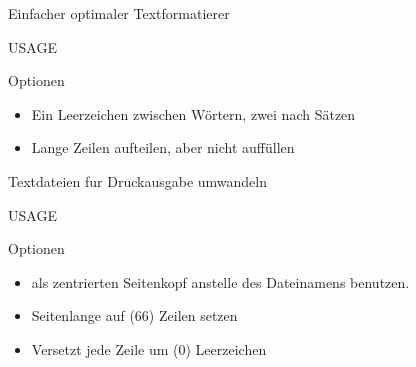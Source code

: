 \documentclass[aspectratio=43]{beamer}
\begin{document}
\begin{frame} 
	\begin{block}{} 
         Einfacher optimaler Textformatierer
	\end{block}
	\begin{block}{USAGE} 
	\end{block}
	\begin{exampleblock}{Optionen} 
	\begin{itemize}
	\item {} \newline Ein Leerzeichen zwischen Wörtern, zwei nach Sätzen
	\item {} \newline Lange Zeilen aufteilen, aber nicht auffüllen
	\end{itemize}
	
	\end{exampleblock}
\end{frame}

\begin{frame} 
	\begin{block}{} 
        Textdateien fur Druckausgabe umwandeln
	\end{block}
	\begin{block}{USAGE} 
	\end{block}
	\begin{exampleblock}{Optionen} 
	\begin{itemize}
	\item {} \newline   {}   als   zentrierten  Seitenkopf  anstelle  des  Dateinamens   benutzen. 
	\item {} \newline Seitenlange auf   (66)  Zeilen  setzen  
	\item {} \newline Versetzt  jede  Zeile  um    (0) Leerzeichen
	\end{itemize}
	
	\end{exampleblock}
\end{frame}
\end{document}
